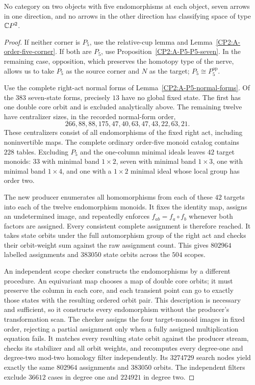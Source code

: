 \begin{proposition}
\label{CP2:A-five-five-seven}
No category on two objects with five endomorphisms at each
object, seven arrows in one direction, and no arrows in the
other direction has classifying space of type $\mathbb{C}P^2$.
\end{proposition}
\begin{proof}
If neither corner is $P_5$, use the relative-cup lemma and
Lemma~\ref{CP2:A-order-five-corner}. If both are $P_5$, use
Proposition~\ref{CP2:A-P5-P5-seven}. In the remaining case,
opposition, which preserves the homotopy type of the nerve,
allows us to take $P_5$ as the source corner and $N$ as the
target; $P_5\cong P_5^{\mathrm{op}}$.

Use the complete right-act normal forms of
Lemma~\ref{CP2:A-P5-normal-forms}. Of the $383$ seven-state
forms, precisely $13$ have no global fixed state. The first
has one double core orbit and is excluded analytically above.
The remaining twelve have centralizer sizes, in the recorded
normal-form order,
\[
266,88,88,175,47,40,63,47,43,22,63,21.
\]
These centralizers consist of all endomorphisms of the fixed
right act, including noninvertible maps. The complete ordinary
order-five monoid catalog contains $228$ tables. Excluding
$P_5$ and the one-column minimal ideals leaves $42$ target
monoids: $33$ with minimal band $1\times2$, seven with
minimal band $1\times3$, one with minimal band $1\times4$,
and one with a $1\times2$ minimal ideal whose local group
has order two.

The new producer  enumerates
all homomorphisms from each of these $42$ targets into each
of the twelve endomorphism monoids. It fixes the identity map,
assigns an undetermined image, and repeatedly enforces
$f_{ab}=f_a\circ f_b$ whenever both factors are assigned.
Every consistent complete assignment is therefore reached.
It takes state orbits under the full automorphism group of the
right act and checks their orbit-weight sum against the raw
assignment count. This gives $802964$ labelled assignments
and $383050$ state orbits across the $504$ scopes.

An independent scope checker
 constructs the
endomorphisms by a different procedure. An equivariant map
chooses a map of double core orbits; it must preserve the
column in each core, and each transient point can go to
exactly those states with the resulting ordered orbit pair.
This description is necessary and sufficient, so it constructs
every endomorphism without the producer's transformation
scan. The checker assigns the four target-monoid images in
fixed order, rejecting a partial assignment only when a fully
assigned multiplication equation fails. It matches every
resulting state orbit against the producer stream, checks its
stabilizer and all orbit weights, and recomputes every degree-one
and degree-two mod-two homology filter independently. Its $3274729$ search nodes yield
exactly the same $802964$ assignments and $383050$ orbits. The
independent filters exclude $36612$ cases in degree one and
$224921$ in degree two.


\end{proof}
